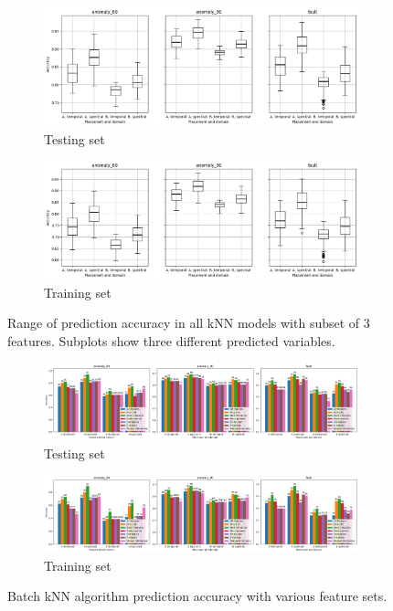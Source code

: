 \begin{figure}[ht]
    \centering
    \begin{subfigure}[b]{\textwidth}
        \includegraphics[width=\textwidth]{assets/design/kNN-3-features-combinations-train.png}
        \caption{Testing set}
    \end{subfigure}
    \hfill
    \begin{subfigure}[b]{\textwidth}
        \includegraphics[width=\textwidth]{assets/design/kNN-3-features-combinations-test.png}
        \caption{Training set}
    \end{subfigure}
    \caption{Range of prediction accuracy in all kNN models with subset of 3 features. Subplots show three different predicted variables.}
\end{figure}


\begin{figure}[ht]
    \centering
    \begin{subfigure}[b]{\textwidth}
        \includegraphics[width=\textwidth]{assets/design/kNN-feature-selection-predictions-train.png}
        \caption{Testing set}
    \end{subfigure}
    \hfill
    \begin{subfigure}[b]{\textwidth}
        \includegraphics[width=\textwidth]{assets/design/kNN-feature-selection-predictions-test.png}
        \caption{Training set}
    \end{subfigure} 
    \caption{Batch kNN algorithm prediction accuracy with various feature sets.}
\end{figure}

